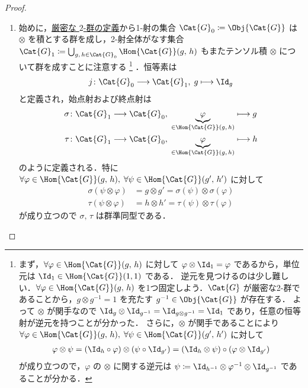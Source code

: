 \documentclass[TQFT_main]{subfiles}
\begin{document}
\begin{proof}
\begin{enumerate}
        \item 始めに，\hyperref[def:W2G-C2G]{厳密な $2$-群の定義}から1-射の集合 $\Cat{G}_0 \coloneqq \Obj{\Cat{G}}$ は $\otimes$ を積とする群を成し，2-射全体がなす集合 $\Cat{G}_1 \coloneqq \bigcup_{g,\, h \in \Cat{G}_0} \Hom{\Cat{G}}(g,\, h)$ もまたテンソル積 $\otimes$ について群を成すことに注意する
        \footnote{
            まず，$\forall \varphi \in \Hom{\Cat{G}}(g,\, h)$ に対して $\varphi \otimes \Id_1 = \varphi$ であるから，単位元は $\Id_1 \in \Hom{\Cat{G}}(1, 1)$ である．
            逆元を見つけるのは少し難しい．$\forall \varphi \in \Hom{\Cat{G}}(g,\, h)$ を1つ固定しよう．$\Cat{G}$ が厳密な2-群であることから，$g \otimes g^{-1} = 1$ を充たす $g^{-1} \in \Obj{\Cat{G}}$ が存在する．
            よって $\otimes$ が関手なので $\Id_g \otimes \Id_{g^{-1}} = \Id_{g \otimes g^{-1}} = \Id_{1}$ であり，任意の恒等射が逆元を持つことが分かった．
            さらに，$\otimes$ が関手であることにより $\forall \varphi \in \Hom{\Cat{G}}(g,\, h),\; \forall \psi \in \Hom{\Cat{G}} (g',\, h')$ に対して
            \begin{align}
                \varphi \otimes \psi = (\Id_h \circ \varphi) \otimes (\psi \circ \Id_{g'}) = (\Id_h \otimes \psi) \circ (\varphi \otimes \Id_{g'})
            \end{align}
            が成り立つので，$\varphi$ の $\otimes$ に関する逆元は $\psi \coloneqq \Id_{h^{-1}} \otimes \varphi^{-1} \otimes \Id_{g^{-1}}$ であることが分かる．
        }
        ．恒等素は
        \begin{align}
            j \colon \Cat{G}_0 \lto \Cat{G}_1,\; g \lmto \Id_g
        \end{align}
        と定義され，始点射および終点射は
        \begin{align}
            \sigma \colon \Cat{G}_1 &\lto \Cat{G}_0,\; \underbrace{\varphi}_{\in \Hom{\Cat{G}}(g,\, h)} \lmto g \\
            \tau \colon \Cat{G}_1 &\lto \Cat{G}_0,\; \underbrace{\varphi}_{\in \Hom{\Cat{G}}(g,\, h)} \lmto h
        \end{align}
        のように定義される．特に $\forall \varphi \in \Hom{\Cat{G}}(g,\, h),\; \forall \psi \in \Hom{\Cat{G}}(g',\, h')$ に対して
        \begin{align}
            \sigma (\psi \otimes \varphi) &= g \otimes g' = \sigma(\psi) \otimes \sigma(\varphi) \\
            \tau (\psi \otimes \varphi) &= h \otimes h' = \tau(\psi) \otimes \tau(\varphi)
        \end{align}
        が成り立つので $\sigma,\, \tau$ は群準同型である．


\end{enumerate}
\end{proof}
\end{document}
